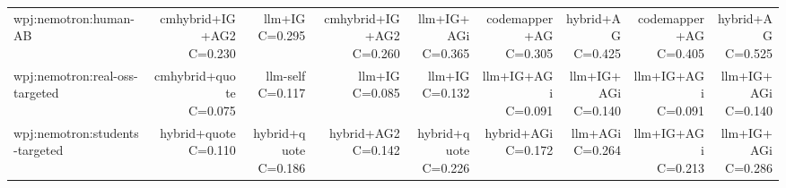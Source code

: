 \begin{table}[t]
{\begin{tabular}{@{}lrrrrrrrr@{}}
wpj:nemotron:human-AB & \shortstack{cmhybrid+IG+AG2\\C=0.230} & \shortstack{llm+IG\\C=0.295} & \shortstack{cmhybrid+IG+AG2\\C=0.260} & \shortstack{llm+IG+AGi\\C=0.365} & \shortstack{codemapper+AG\\C=0.305} & \shortstack{hybrid+AG\\C=0.425} & \shortstack{codemapper+AG\\C=0.405} & \shortstack{hybrid+AG\\C=0.525} \\
wpj:nemotron:real-oss-targeted & \shortstack{cmhybrid+quote\\C=0.075} & \shortstack{llm-self\\C=0.117} & \shortstack{llm+IG\\C=0.085} & \shortstack{llm+IG\\C=0.132} & \shortstack{llm+IG+AGi\\C=0.091} & \shortstack{llm+IG+AGi\\C=0.140} & \shortstack{llm+IG+AGi\\C=0.091} & \shortstack{llm+IG+AGi\\C=0.140} \\
wpj:nemotron:students-targeted & \shortstack{hybrid+quote\\C=0.110} & \shortstack{hybrid+quote\\C=0.186} & \shortstack{hybrid+AG2\\C=0.142} & \shortstack{hybrid+quote\\C=0.226} & \shortstack{hybrid+AGi\\C=0.172} & \shortstack{llm+AGi\\C=0.264} & \shortstack{llm+IG+AGi\\C=0.213} & \shortstack{llm+IG+AGi\\C=0.286} \\
\bottomrule
\end{tabular}
}
\end{table}

